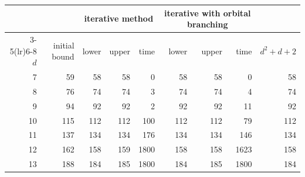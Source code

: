 \begin{tabular}{rrrrrrrrr}
\toprule
 & & \multicolumn{3}{c}{iterative method} & \multicolumn{3}{c}{iterative with orbital branching} & \\
\cmidrule(lr){3-5}\cmidrule(lr){6-8}
$d$ & initial bound & lower & upper & time & lower & upper & time & $d^2+d+2$ \\
\midrule
7 & 59 & 58 & 58 & 0 & 58 & 58 & 0 & 58 \\
8 & 76 & 74 & 74 & 3 & 74 & 74 & 4 & 74 \\
9 & 94 & 92 & 92 & 2 & 92 & 92 & 11 & 92 \\
10 & 115 & 112 & 112 & 100 & 112 & 112 & 79 & 112 \\
11 & 137 & 134 & 134 & 176 & 134 & 134 & 146 & 134 \\
12 & 162 & 158 & 159 & 1800 & 158 & 158 & 1623 & 158 \\
13 & 188 & 184 & 185 & 1800 & 184 & 185 & 1800 & 184 \\
\bottomrule
\end{tabular}
